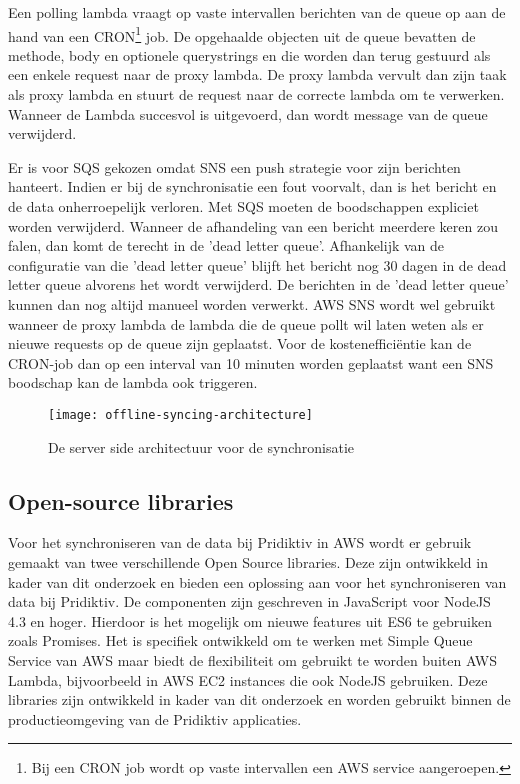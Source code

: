 Een polling lambda vraagt op vaste intervallen berichten van de queue op aan de hand van een CRON\footnote{Bij een CRON job wordt op vaste intervallen een AWS service aangeroepen.} job. De opgehaalde objecten uit de queue bevatten de methode, body en optionele querystrings en die worden dan terug gestuurd als een enkele request naar de proxy lambda. De proxy lambda vervult dan zijn taak als proxy lambda en stuurt de request naar de correcte lambda om te verwerken. Wanneer de Lambda succesvol is uitgevoerd, dan wordt message van de queue verwijderd.

Er is voor SQS gekozen omdat SNS een push strategie voor zijn berichten hanteert. Indien er bij de synchronisatie een fout voorvalt, dan is het bericht en de data onherroepelijk verloren. Met SQS moeten de boodschappen expliciet worden verwijderd. Wanneer de afhandeling van een bericht meerdere keren zou falen, dan komt de  terecht in de 'dead letter queue'. Afhankelijk van de configuratie van die 'dead letter queue' blijft het bericht nog 30 dagen in de dead letter queue alvorens het wordt verwijderd. De berichten in de 'dead letter queue' kunnen dan nog altijd manueel worden verwerkt. AWS SNS wordt wel gebruikt wanneer de proxy lambda de lambda die de queue pollt wil laten weten als er nieuwe requests op de queue zijn geplaatst. Voor de kosteneffici\"entie kan de CRON-job dan op een interval van 10 minuten worden geplaatst want een SNS boodschap kan de lambda ook triggeren.

\begin{figure}[h]
\caption{De server side architectuur voor de synchronisatie}
\centering
\texttt{[image: offline-syncing-architecture]}
\end{figure}

\subsection{Open-source libraries}
Voor het synchroniseren van de data bij Pridiktiv in AWS wordt er gebruik gemaakt van twee verschillende Open Source libraries. Deze zijn ontwikkeld in kader van dit onderzoek en bieden een oplossing aan voor het synchroniseren van data bij Pridiktiv. De componenten zijn geschreven in JavaScript voor NodeJS 4.3 en hoger. Hierdoor is het mogelijk om nieuwe features uit ES6 te gebruiken zoals Promises. Het is specifiek ontwikkeld om te werken met Simple Queue Service van AWS maar biedt de flexibiliteit om gebruikt te worden buiten AWS Lambda, bijvoorbeeld in AWS EC2 instances die ook NodeJS gebruiken. Deze libraries zijn ontwikkeld in kader van dit onderzoek en worden gebruikt binnen de productieomgeving van de Pridiktiv applicaties.
